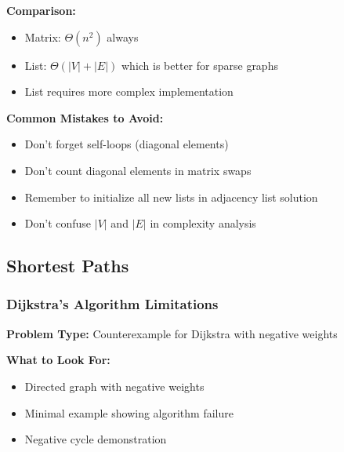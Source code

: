 \textbf{Comparison:}
\begin{itemize}[noitemsep,leftmargin=*]
    \item Matrix: $\Theta(n^2)$ always
    \item List: $\Theta(|V| + |E|)$ which is better for sparse graphs
    \item List requires more complex implementation
\end{itemize}

\textbf{Common Mistakes to Avoid:}
\begin{itemize}[noitemsep,leftmargin=*]
    \item Don't forget self-loops (diagonal elements)
    \item Don't count diagonal elements in matrix swaps
    \item Remember to initialize all new lists in adjacency list solution
    \item Don't confuse $|V|$ and $|E|$ in complexity analysis
\end{itemize}

\FloatBarrier

\subsection{Shortest Paths}
\subsubsection{Dijkstra's Algorithm Limitations}
\textbf{Problem Type:} Counterexample for Dijkstra with negative weights

\textbf{What to Look For:}
\begin{itemize}[noitemsep,leftmargin=*]
    \item Directed graph with negative weights
    \item Minimal example showing algorithm failure
    \item Negative cycle demonstration
\end{itemize}


